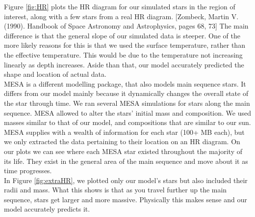 \documentclass[10pt]{article}
\begin{document}
Figure \ref{fig:HR} plots the HR diagram for our simulated stars in the region of interest, along with a few stars from a real HR diagram. [Zombeck, Martin V. (1990). Handbook of Space Astronomy and Astrophysics, pages 68, 73] The main difference is that the general slope of our simulated data is steeper. One of the more likely reasons for this is that we used the surface temperature, rather than the effective temperature. This would be due to the temperature not increasing linearly as depth increases. Aside than that, our model accurately predicted the shape and location of actual data. \\

MESA is a different modelling package, that also models main sequence stars. It differs from our model mainly because it dynamically changes the overall state of the star through time. We ran several MESA simulations for stars along the main sequence. MESA allowed to alter the stars' initial mass and composition. We used masses similar to that of our model, and compositions that are similar to our sun. MESA supplies with a wealth of information for each star (100+ MB each), but we only extracted the data pertaining to their location on an HR diagram. On our plots we can see where each MESA star existed throughout the majority of its life. They exist in the general area of the main sequence and move about it as time progresses. \\

In Figure \ref{fig:extraHR}, we plotted only our model's stars but also included their radii and mass. What this shows is that as you travel further up the main sequence, stars get larger and more massive. Physically this makes sense and our model accurately predicts it.
\end{document}
